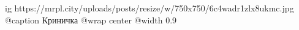  
 
 
 
 

\ifcmt
  ig https://mrpl.city/uploads/posts/resize/w/750x750/6c4wadr1zlx8ukmc.jpg
	@caption Криничка
  @wrap center
  @width 0.9
\fi
